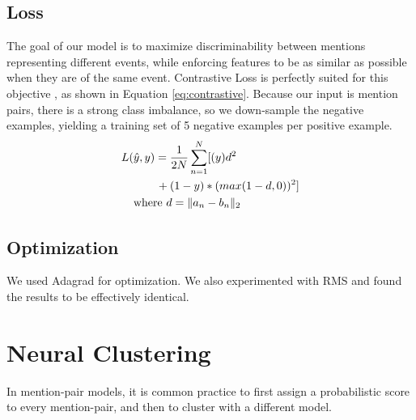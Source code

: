 \documentclass[11pt,a4paper]{article}
\begin{document}
\subsection{Loss}
The goal of our model is to maximize discriminability between mentions representing different events, while enforcing features to be as similar as possible when they are of the same event.  Contrastive Loss is perfectly suited for this objective \cite{SchroffKP15,pmlr-v48-liud16}, as shown in Equation \ref{eq:contrastive}.  Because our input is mention pairs, there is a strong class imbalance, so we down-sample the negative examples, yielding a training set of 5 negative examples per positive example.
\begin{equation}
\begin{aligned}
L(&\hat{y},y)=\frac{1}{2N}\sum_{n=1}^{N}[(y)d^2 \\
&\qquad {} + (1-y)*(max(1-d,0))^2] \\
&\textnormal{where }d=\|a_{n}-b_{n}\|_{2}
\end{aligned}
\label{eq:contrastive}
\end{equation}

\subsection{Optimization}
We used Adagrad for optimization.  We also experimented with RMS and found the results to be effectively identical.

\section{Neural Clustering}
\label{sec:clustering}
In mention-pair models, it is common practice to first assign a probabilistic score to every mention-pair, and then to cluster with a different model.
\end{document}
